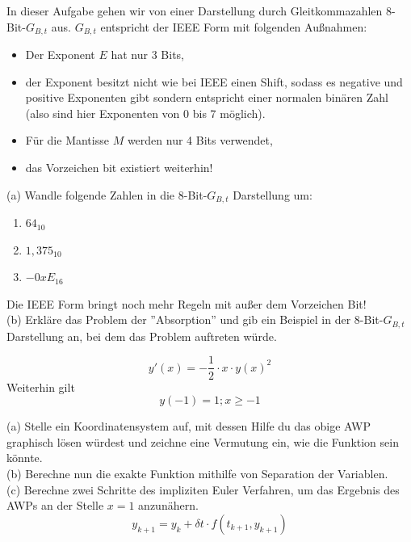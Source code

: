 \documentclass{scrartcl}
\begin{document}
	In dieser Aufgabe gehen wir von einer Darstellung durch Gleitkommazahlen 8-Bit-$G_{B,t}$ aus. $G_{B,t}$ entspricht der IEEE Form mit folgenden Außnahmen:
	\begin{itemize}
		\item Der Exponent $E$ hat nur 3 Bits,
		\item der Exponent besitzt nicht wie bei IEEE einen Shift, sodass es negative und positive Exponenten gibt sondern entspricht einer normalen binären Zahl (also sind hier Exponenten von 0 bis 7 möglich).
		\item Für die Mantisse $M$ werden nur 4 Bits verwendet,
		\item das Vorzeichen bit existiert weiterhin!
	\end{itemize}
	(a) 
	Wandle folgende Zahlen in die 8-Bit-$G_{B,t}$ Darstellung um:
	\begin{enumerate}
		\item $64_{10}$
		\item $1,375_{10}$
		\item $- 0xE_{16}$
	\end{enumerate}
	 Die IEEE Form bringt noch mehr Regeln mit außer dem Vorzeichen Bit!
	\lbreak \lbreak \lbreak \lbreak
	\\
	(b) 
	Erkläre das Problem der ''Absorption'' und gib ein Beispiel in der 8-Bit-$G_{B,t}$ Darstellung an, bei dem das Problem auftreten würde.
	


	\sbreak
	$$y'(x) = -\frac{1}{2} \cdot x \cdot y(x)^2$$
	Weiterhin gilt $$y(-1) = 1; x \ge -1$$
	
	\sbreak
	(a)
	Stelle ein Koordinatensystem auf, mit dessen Hilfe du das obige AWP graphisch lösen würdest und zeichne eine Vermutung ein, wie die Funktion sein könnte.
	\lbreak \lbreak \lbreak \lbreak
	\\
	(b)
	Berechne nun die exakte Funktion mithilfe von Separation der Variablen.
	\lbreak \lbreak \lbreak \lbreak
	\\
	(c)
	Berechne zwei Schritte des impliziten Euler Verfahren, um das Ergebnis des AWPs an der Stelle $x=1$ anzunähern.
	$$y_{k+1} = y_k + \delta t \cdot f(t_{k+1}, y_{k+1})$$
\end{document}
